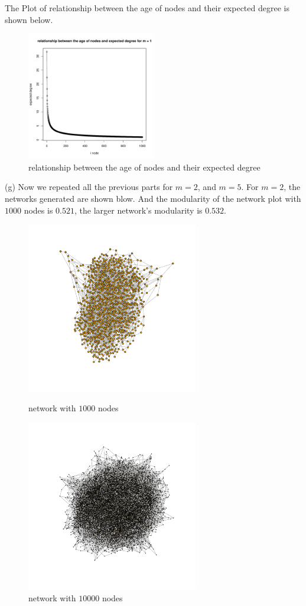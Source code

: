 \documentclass[draftcls,12pt,onecolumn]{IEEEtran}
\begin{document}
The Plot of relationship between the age of nodes and their expected degree is shown below.

\begin{figure}[h]
\centering
\includegraphics[width=0.5\textwidth]{1_2_f.pdf}
\caption{relationship between the age of nodes and their expected degree}
\end{figure}

(g) Now we repeated all the previous parts for $m = 2$, and $m = 5$. 
 For $m = 2$, the networks generated are shown blow. And the modularity of the network plot with $1000$ nodes is $0.521$, the larger network's modularity is $0.532$.
\begin{figure}[htbp]
\centering
\begin{minipage}[t]{0.48\textwidth}
\centering
\includegraphics[width=7.5cm]{img/2_g_1_network}
\caption{network with $1000$ nodes}
\end{minipage}
\begin{minipage}[t]{0.48\textwidth}
\centering
\includegraphics[width=7.5cm]{img/2_g_1_network2}
\caption{network with $10000$ nodes}
\end{minipage}
\end{figure}
\end{document}
